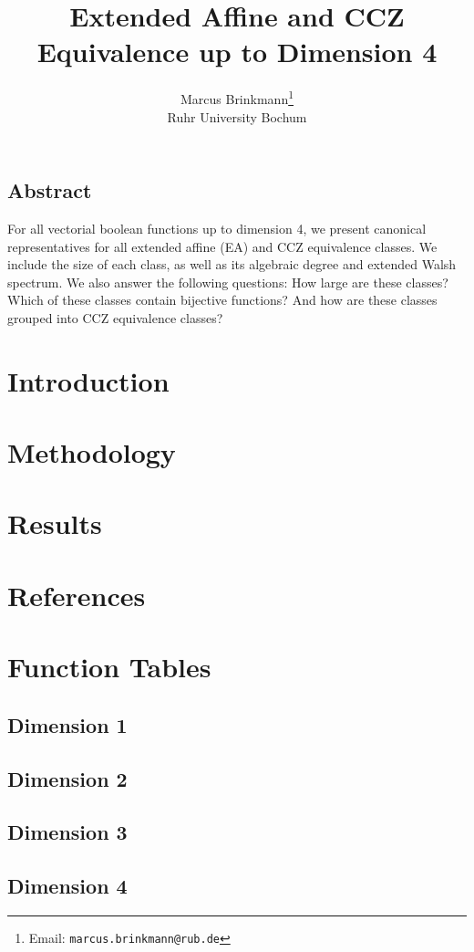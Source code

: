 \documentclass[a4paper,twocolumn,10pt]{article}
\begin{document}
\date{}

\title{Extended Affine and CCZ Equivalence up to Dimension 4}

\author{
{\rm Marcus Brinkmann}\thanks{Email: \texttt{marcus.brinkmann@rub.de}}\\
Ruhr University Bochum
}

\maketitle


\subsection*{Abstract}

For all vectorial boolean functions up to dimension 4, we present canonical representatives for all extended affine (EA) and CCZ equivalence classes.  We include the size of each class, as well as its algebraic degree and extended Walsh spectrum.  We also answer the following questions: How large are these classes? Which of these classes contain bijective functions? And how are these classes grouped into CCZ equivalence classes?

\section{Introduction}

\section{Methodology}

\section{Results}

\appendix

\section{References}



\newpage
\section{Function Tables}
\subsection{Dimension 1}

\subsection{Dimension 2}

\newpage\onecolumn
\subsection{Dimension 3}

\newpage
\subsection{Dimension 4}

\end{document}
